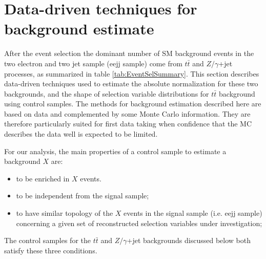 % 

\section{Data-driven techniques for background estimate} \label{sec:bkgStudy}
After the event selection the dominant number of SM background events in the two electron and two jet sample (eejj sample) 
come from $t\bar{t}$ and $Z/\gamma$+jet processes, as summarized in table \ref{tab:EventSelSummary}. 
This section describes data-driven techniques used to estimate the absolute 
normalization for these two backgrounds, and the shape of selection variable 
distributions for $t\bar{t}$ background using control samples. 
The methods for background estimation described here are based on data and complemented by some Monte Carlo information. 
They are therefore particularly suited for first data taking when confidence that the MC describes
the data well is expected to be limited.

For our analysis, the main properties of a control sample to estimate a background $X$ are:
\begin{itemize}
%
\item to be enriched in $X$ events.
%
\item to be independent from the signal sample;
%
\item to have similar topology of the $X$ events in the signal sample (i.e. eejj sample) 
concerning a given set of reconstructed selection variables under investigation;  
%
\end{itemize}
%
The control samples for the $t\bar{t}$ and $Z/\gamma$+jet backgrounds discussed below both satisfy these three conditions.



